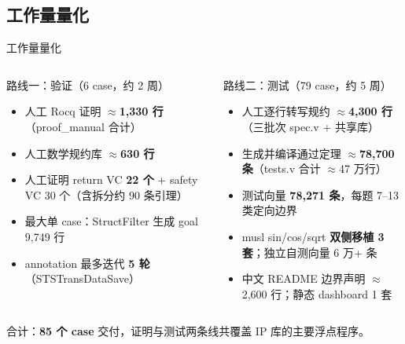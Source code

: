 \documentclass[UTF8,aspectratio=169]{ctexbeamer}
\begin{document}
\subsection{工作量量化}
\begin{frame}{工作量量化}
  \begin{columns}[T]
    \begin{block}{路线一：验证（6 case，约 2 周）}
      \small
      \begin{itemize}
        \item 人工 Rocq 证明 \textbf{$\approx$1{,}330 行}（proof\_manual 合计）
        \item 人工数学规约库 \textbf{$\approx$630 行}
        \item 人工证明 return VC \textbf{22 个} + safety VC 30 个（含拆分约 90 条引理）
        \item 最大单 case：StructFilter 生成 goal 9{,}749 行
        \item annotation 最多迭代 \textbf{5 轮}（STSTransDataSave）
      \end{itemize}
    \end{block}
    \begin{block}{路线二：测试（79 case，约 5 周）}
      \small
      \begin{itemize}
        \item 人工逐行转写规约 \textbf{$\approx$4{,}300 行}（三批次 spec.v + 共享库）
        \item 生成并编译通过定理 \textbf{$\approx$78{,}700 条}（tests.v 合计 $\approx$47 万行）
        \item 测试向量 \textbf{78{,}271 条}，每题 7--13 类定向边界
        \item musl sin/cos/sqrt \textbf{双侧移植 3 套}；独立自测向量 6 万+ 条
        \item 中文 README 边界声明 $\approx$2{,}600 行；静态 dashboard 1 套
      \end{itemize}
    \end{block}
  \end{columns}
  \vspace{0.4em}
  \centering\small
  合计：\textbf{85 个 case} 交付，证明与测试两条线共覆盖 IP 库的主要浮点程序。
\end{frame}
\end{document}
